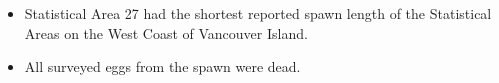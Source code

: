 \begin{itemize}
\item Statistical Area 27 had the shortest reported spawn length of the Statistical Areas on the West Coast of Vancouver Island.
\item All surveyed eggs from the spawn were dead.
\end{itemize}